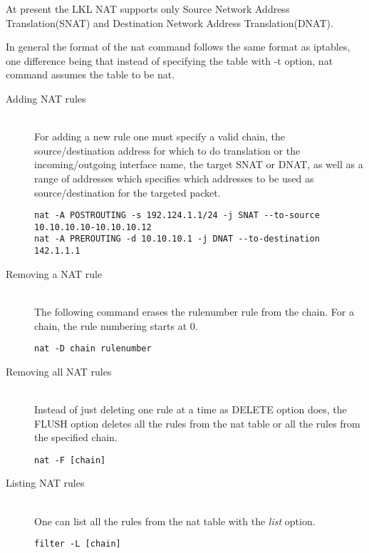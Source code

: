 {{\lstset{language=C, caption=struct nat_nf_range}


At present the LKL NAT supports only  Source Network Address Translation(SNAT) and  Destination Network Address Translation(DNAT).

In general the format of the nat command follows the same format as iptables, one difference being that 
instead of specifying the table with -t option, nat command assumes the table to be nat. 
\begin{description}
\item [Adding NAT rules] \hfill \\
For adding a new rule one must specify a valid chain, the source/destination address for which to do 
translation or the incoming/outgoing interface name, the target SNAT or DNAT, as well as a range of 
addresses which specifies which addresses to be used as source/destination for the targeted packet.
\lstset{language=TeX,caption=Adding a NAT rule,label=lst:saddrule}
\begin{lstlisting}
nat -A POSTROUTING -s 192.124.1.1/24 -j SNAT --to-source 10.10.10.10-10.10.10.12
nat -A PREROUTING -d 10.10.10.1 -j DNAT --to-destination 142.1.1.1
\end{lstlisting}
\item[Removing a NAT rule] \hfill \\
The following command erases the rulenumber rule from the chain. For a chain, the rule numbering starts at 0.
\lstset{language=TeX,caption=Deleting a NAT rule,label=lst:sdelrule}
\begin{lstlisting}
nat -D chain rulenumber
\end{lstlisting}
\item[Removing all NAT rules] \hfill \\
Instead of just deleting one rule at a time as DELETE option does, the FLUSH option deletes all the rules from the nat table or all the rules from the specified chain.
\lstset{language=TeX,caption=Deleting more NAT rules,label=lst:sdelallrules}
\begin{lstlisting}
nat -F [chain]
\end{lstlisting}
\item [Listing NAT rules] \hfill \\
One can list all the rules from the nat table with the \textit{list} option.
\lstset{language=TeX,caption=List NAT rules,label=lst:slstrule}
\begin{lstlisting}
filter -L [chain]
\end{lstlisting}
\end{description}

}}
